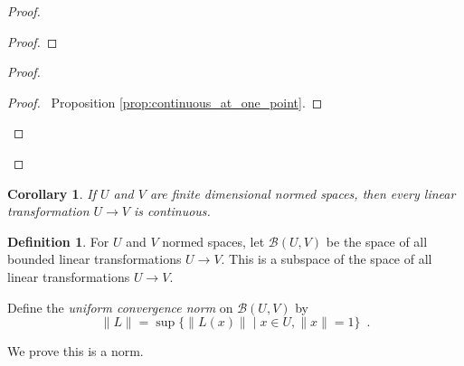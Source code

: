 \documentclass{book}
\let\qed\relax
\newtheorem{cor}{Corollary}[ax]
\theoremstyle{definition}
\newtheorem{df}[ax]{Definition}
\begin{document}
\begin{proof}
\pf
{}
\begin{proof}
\end{proof}
\begin{proof}
	\qedstep
	\begin{proof}
		\pf\ Proposition \ref{prop:continuous_at_one_point}.
	\end{proof}
	\qed
\end{proof}
\qed
\end{proof}

\begin{cor}
If $U$ and $V$ are finite dimensional normed spaces, then every linear transformation $U \rightarrow V$ is continuous.
\end{cor}

\begin{df}
For $U$ and $V$ normed spaces, let $\mathcal{B}(U,V)$ be the space of all bounded linear transformations $U \rightarrow V$. This is a subspace of the space of all linear transformations $U \rightarrow V$.

Define the \emph{uniform convergence norm} on $\mathcal{B}(U,V)$ by
\[ \| L \| = \sup \{ \| L(x) \| \mid x \in U, \| x \| = 1 \} \enspace . \]

We prove this is a norm.
\end{df}
\end{document}

